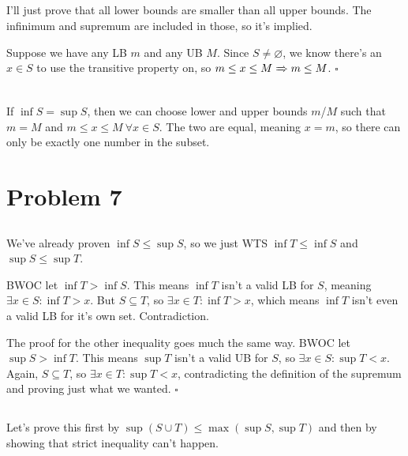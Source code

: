 \documentclass[12pt]{article}
\newcommand{\ra}{\xRightarrow}
\begin{document}
\subsection{}

I'll just prove that all lower bounds are smaller than all upper bounds.
The infinimum and supremum are included in those, so it's implied.

Suppose we have any LB $m$ and any UB $M$.
Since $S \ne \varnothing$, we know there's an $x \in S$ to use the transitive property on,
so $m \le x \le M \ra\ m \le M$. $\square$

\subsection{}

If $\inf S = \sup S$, then we can choose lower and upper bounds $m$/$M$
such that $m=M$ and $m \le x \le M\ \forall x \in S$.
The two are equal, meaning $x=m$, so there can only be exactly one number
in the subset.

\pagebreak

\section{Problem 7}

\subsection{}

We've already proven $\inf S \le \sup S$, so we just WTS $\inf T \le \inf S$ and $\sup S \le \sup T$.

BWOC let $\inf T > \inf S$.
This means $\inf T$ isn't a valid LB for $S$, meaning $\exists x \in S: \inf T > x$.
But $S \subseteq T$, so $\exists x \in T: \inf T > x$,
which means $\inf T$ isn't even a valid LB for it's own set.
Contradiction.

The proof for the other inequality goes much the same way.
BWOC let $\sup S > \inf T$.
This means $\sup T$ isn't a valid UB for $S$, so $\exists x \in S: \sup T < x$.
Again, $S \subseteq T$, so $\exists x \in T: \sup T < x$,
contradicting the definition of the supremum and proving just what we wanted. $\square$

\subsection{}

Let's prove this first by $\sup(S \cup T) \le \max(\sup S, \sup T)$ and then
by showing that strict inequality can't happen.
\end{document}

